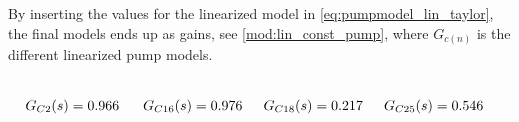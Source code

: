 By inserting the values for the linearized model in \eqref{eq:pumpmodel_lin_taylor}, the final models ends up as gains, see \ref{mod:lin_const_pump}, where $G_{c(n)}$ is the different linearized pump models. 


\vspace{-0.5cm}


\begin{equation}
  \begin{minipage}[b]{0.25\textwidth}
  \begin{equation*}
  	\begin{split}
  		G_{C2}(s) &= 0.966
  	\end{split}
  \end{equation*}
  \end{minipage}
  \begin{minipage}[b]{0.25\textwidth}
  \begin{equation*}
  	\begin{split}
  		G_{C16}(s) &= 0.976
  	\end{split}
  \end{equation*}

  \end{minipage}
  \begin{minipage}[b]{0.25\textwidth}
  \begin{equation*}
  	\begin{split}
  		G_{C18}(s) &= 0.217
  	\end{split}
  \end{equation*}
  \end{minipage}
  \begin{minipage}[b]{0.25\textwidth}
  \begin{equation*}
  	\begin{split}
  		G_{C25}(s) &= 0.546
  	\end{split}
  \end{equation*}
  \end{minipage}
  \label{mod:lin_const_pump}
\end{equation}





